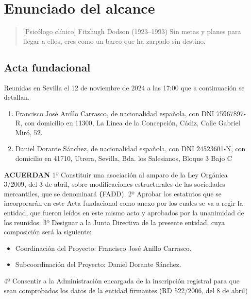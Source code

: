 \chapter{Enunciado del alcance}

\begin{quotation}[Psicólogo clínico] {Fitzhugh Dodson (1923--1993)}
Sin metas y planes para llegar a ellos, eres como un barco que ha zarpado sin destino.
\end{quotation}


\begin{abstract}
Para gestionar exitosamente un proyecto y cumplir con las metas planteadas al comienzo del mismo, es prioritario establecer y definir el alcance del mismo. 
\end{abstract}

\clearpage

\section{Acta fundacional}

Reunidas en Sevilla el 12 de noviembre de 2024 a las 17:00 que a continuación se detallan.

\begin{enumerate}
\item Francisco José Anillo Carrasco, de nacionalidad española, con DNI 75967897-R, con domicilio en 11300, La Línea de la Concepción, Cádiz, Calle Gabriel Miró, 52.
    \item Daniel Dorante Sánchez, de nacionalidad española, con DNI 24523601-N, con domicilio en 41710, Utrera, Sevilla, Bda. los Salesianos, Bloque 3 Bajo C
\end{enumerate}
    
\textbf{ACUERDAN}
1º Constituir una asociación al amparo de la Ley Orgánica 3/2009, del 3 de abril, sobre modificaciones estructurales de las sociedades mercantiles, que se denominará  \textbf(FADD).
2º Aprobar los estatutos que se incorporarán en este Acta fundacional como anexo por los cuales se va a regir la entidad, que fueron leídos en este mismo acto y aprobados por la unanimidad de los reunidos.
3º Designar a la Junta Directiva de la presente entidad, cuya composición será la siguiente:
\begin{itemize}
    \item Coordinación del Proyecto: Francisco José Anillo Carrasco.
    \item Subcoordinación del Proyecto: Daniel Dorante Sánchez.
\end{itemize}
4º Consentir a la Administración encargada de la inscripción registral para que sean comprobados los datos de la entidad firmantes (RD 522/2006, del 8 de abril)

